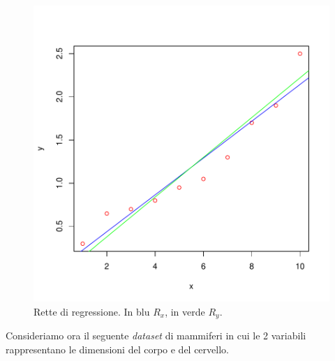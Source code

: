 \documentclass[onecolumn,11pt]{book}
\begin{document}
\begin{figure}[htbp]
\begin{center}
\includegraphics{statisticaconR-175}
\caption{Rette di regressione. In blu $R_x$, in verde $R_y$.}
\label{fig:duerettex}
\end{center}
\end{figure}
Consideriamo ora il seguente \emph{dataset} di mammiferi  in cui le 2 variabili rappresentano  le dimensioni del corpo e del cervello.
\end{document}
